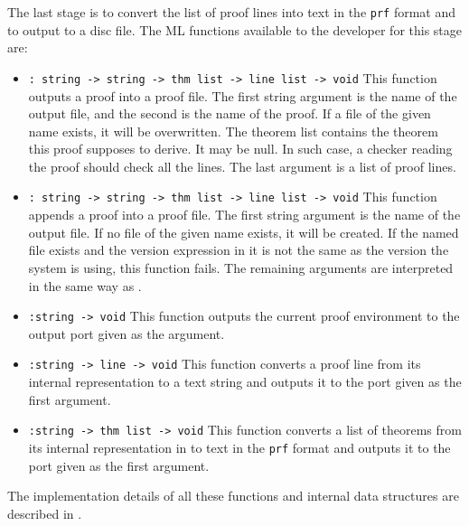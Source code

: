 The last stage is to convert the list of proof lines into text in the
{\tt prf} format and to output to a disc file.
The ML functions available to the developer for this stage are:
\begin{itemize}
\item {}
\verb|: string -> string -> thm list -> line list -> void|\newline
This function outputs a proof into a proof file. The first string argument is
the name of the output file, and the second is the name of the proof.
If a file of the given name exists, it will be overwritten. The
theorem list contains the theorem this proof supposes to derive. It
may be null. In such case, a checker reading the proof should check
all the lines. The last argument is a list of proof lines.
\item {}
\verb|: string -> string -> thm list -> line list -> void|\newline
This function appends a proof into a proof file. The first string
argument is the name of the output file. If no file of the given name
exists, it will be created. If the named file exists and the version
expression in it is not the same as the version the system is using, this
function fails. The remaining arguments are interpreted in the same
way as .
\item {} \verb|:string -> void|\newline
This function outputs the current proof environment to the output
port given as the argument.
\item {} \verb|:string -> line -> void|\newline
This function converts a proof line from its internal representation
to a text string and outputs it to the port given as the first argument.
\item {} \verb|:string -> thm list -> void|\newline
This function converts a list of theorems from its internal representation
in to text in the {\tt prf} format and outputs it to the port given as
the first argument.
\end{itemize}

The implementation details of all these functions and internal data
structures are described in \cite{WW:recordproof}.